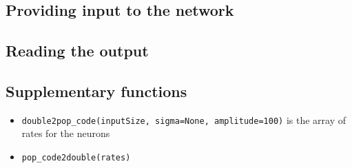 \subsection{Providing input to the network}

\subsection{Reading the output}

\subsection{Supplementary functions}

\begin{itemize}
    \item \verb|double2pop_code(inputSize, sigma=None, amplitude=100)| is the array of rates for the neurons 
    \item \verb|pop_code2double(rates)|
\end{itemize}



 